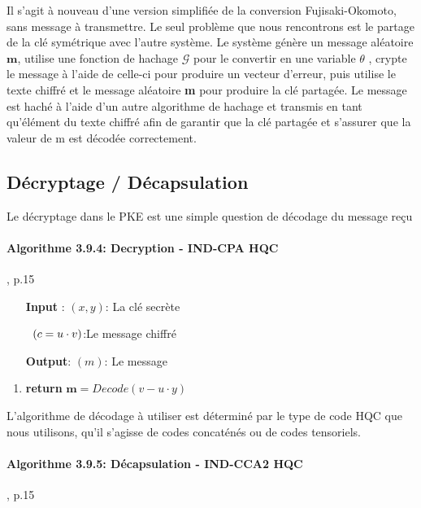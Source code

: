 \documentclass[12pt,openany]{report}
\begin{document}
Il s'agit à nouveau d'une version simplifiée de la conversion Fujisaki-Okomoto, sans message à transmettre. Le seul problème que nous rencontrons est le partage de la clé symétrique avec l'autre système. Le système génère un message aléatoire  $\mathbf{m}$, utilise une fonction de hachage $\mathcal{G}$
pour le convertir en une variable $\theta$ , crypte le message à l'aide de celle-ci pour produire un vecteur d'erreur, puis utilise le texte chiffré et le message aléatoire \textbf{m} pour produire la clé partagée. Le message est haché à l'aide d'un autre algorithme de hachage et transmis en tant qu'élément du texte chiffré afin de garantir que la clé partagée et s'assurer que la valeur de m est décodée correctement.
\subsection{Décryptage / Décapsulation}
Le décryptage dans le PKE est une simple question de décodage du message reçu
\paragraph{Algorithme 3.9.4: Decryption - IND-CPA HQC \\ }\cite{melchor2020}, p.15

\begin{itemize}
\item[\textbf{Input} :]$ (x,y)$: La clé secrète
\item[]       $\hspace{0.2cm}( c=u\cdot v  )$:Le message chiffré
\item[ \textbf{Output}:]$(m) $: Le message
\end{itemize}
\begin{enumerate}
\item \textbf{return} $\mathbf{m}= Decode(v-u\cdot y)$
\end{enumerate}
L'algorithme de décodage à utiliser est déterminé par le type de code HQC que nous utilisons, qu'il s'agisse de codes concaténés ou de codes tensoriels.
\paragraph{Algorithme 3.9.5: Décapsulation - IND-CCA2 HQC \\}\cite{melchor2020}, p.15
\end{document}
